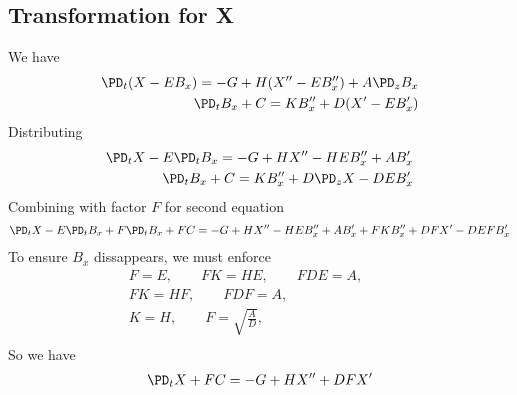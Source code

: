 \documentclass[11pt]{article}
\begin{document}
\subsection{Transformation for X}
We have
\begin{equation}\begin{aligned}
\PD_t (X - E B_x)        = -G+ H (X'' - E B_x'') + A \PD_z B_x \\
\PD_t B_x + C = K B_x'' + D (X' - E B_x') \\
\end{aligned} \end{equation}
Distributing
\begin{equation}\begin{aligned}
\PD_t X - E \PD_t B_x = -G+ H X'' - H E B_x'' + A B_x' \\
\PD_t B_x + C = K B_x'' + D \PD_z X - D E B_x' \\
\end{aligned} \end{equation}
Combining with factor $F$ for second equation
\begin{equation}\begin{aligned}
\PD_t X - E \PD_t B_x + F \PD_t B_x + FC = -G+ H X'' - H E B_x'' + A B_x' + F K B_x'' + DF X' - D EF B_x'\\
\end{aligned} \end{equation}
To ensure $B_x$ dissappears, we must enforce
\begin{equation}\begin{aligned}
F = E, \qquad
FK = HE, \qquad
FDE = A, \qquad \\
FK = HF, \qquad
FDF = A, \qquad \\
K = H, \qquad
F = \sqrt{\frac{A}{D}}, \qquad \\
\end{aligned} \end{equation}
So we have
\begin{equation}\begin{aligned}
\PD_t X + FC = -G+ H X'' + DF X'\\
\end{aligned} \end{equation}
\end{document}
